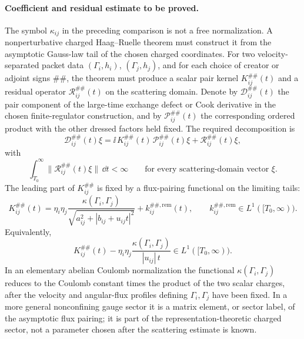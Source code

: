 \paragraph{Coefficient and residual estimate to be proved.}
The symbol \(\kappa_{ij}\) in the preceding comparison is not a free
normalization.  A nonperturbative charged Haag--Ruelle theorem must construct
it from the asymptotic Gauss-law tail of the chosen charged coordinates.
For two velocity-separated packet data
\((\Gamma_i,h_i)\), \((\Gamma_j,h_j)\), and for each choice of creator or
adjoint signs \(\#\#\), the theorem must produce a scalar pair kernel
\(K_{ij}^{\#\#}(t)\) and a residual operator
\(\mathcal R_{ij}^{\#\#}(t)\) on the scattering domain.  Denote by
\(\mathcal D_{ij}^{\#\#}(t)\) the pair component of the large-time exchange
defect or Cook derivative in the chosen finite-regulator construction, and
by \(\mathcal P_{ij}^{\#\#}(t)\) the corresponding ordered product with the
other dressed factors held fixed.  The required decomposition is
\begin{equation}
  \mathcal D_{ij}^{\#\#}(t)\xi
  =
  \ii\,K_{ij}^{\#\#}(t)\,
  \mathcal P_{ij}^{\#\#}(t)\xi
  +
  \mathcal R_{ij}^{\#\#}(t)\xi ,
  \label{eq:charged-pair-coefficient-residual-estimate}
\end{equation}
with
\begin{equation}
  \int_{T_0}^{\infty}
  \|\mathcal R_{ij}^{\#\#}(t)\xi\|\,\dd t<\infty
  \qquad
  \text{for every scattering-domain vector }\xi .
  \label{eq:charged-pair-residual-l1}
\end{equation}
The leading part of \(K_{ij}^{\#\#}\) is fixed by a flux-pairing functional
on the limiting tails:
\begin{equation}
  K_{ij}^{\#\#}(t)
  =
  \eta_i\eta_j
  \frac{\kappa(\Gamma_i,\Gamma_j)}
       {\sqrt{a_{ij}^2+|b_{ij}+u_{ij}t|^2}}
  +
  k_{ij}^{\#\#,\mathrm{rem}}(t),
  \qquad
  k_{ij}^{\#\#,\mathrm{rem}}\in L^1([T_0,\infty)).
  \label{eq:charged-flux-pairing-kernel}
\end{equation}
Equivalently,
\[
  K_{ij}^{\#\#}(t)
  -
  \eta_i\eta_j
  \frac{\kappa(\Gamma_i,\Gamma_j)}{|u_{ij}|\,t}
  \in L^1([T_0,\infty)).
\]
In an elementary abelian Coulomb normalization the functional
\(\kappa(\Gamma_i,\Gamma_j)\) reduces to the Coulomb constant times the
product of the two scalar charges, after the velocity and angular-flux
profiles defining \(\Gamma_i,\Gamma_j\) have been fixed.  In a more general
nonconfining gauge sector it is a matrix element, or sector label, of the
asymptotic flux pairing; it is part of the representation-theoretic charged
sector, not a parameter chosen after the scattering estimate is known.

